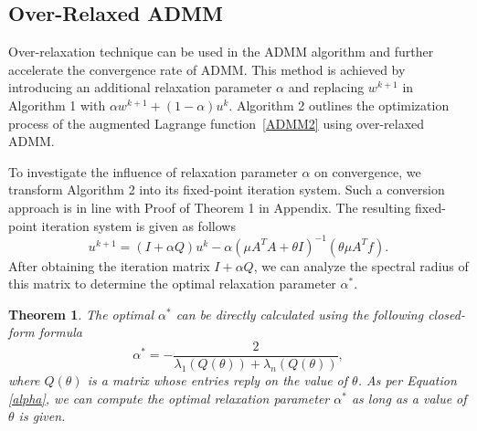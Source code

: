 \documentclass[letterpaper]{article} %
\newtheorem{theorem}{Theorem}
\begin{document}
\subsection{Over-Relaxed ADMM}
Over-relaxation technique can be used in the ADMM algorithm and further accelerate the convergence rate of ADMM. This method is achieved by introducing an additional relaxation parameter $\alpha$ and replacing $w^{k+1}$ in Algorithm 1 with $\alpha w^{k+1}+\left(1-\alpha\right)u^k$. Algorithm 2 outlines  the optimization process of the augmented Lagrange function~\eqref{ADMM2} using over-relaxed ADMM.
\begin{table}[t]
	\label{OR}
	\centering
\end{table}

To investigate the influence of relaxation parameter $\alpha$ on convergence, we transform Algorithm 2 into its fixed-point iteration system. Such a conversion approach is in line with Proof of Theorem 1 in Appendix. The resulting fixed-point iteration system is given as follows
\begin{equation*}
	u^{k+1} = \left(I+ \alpha Q\right) u^{k}- \alpha\left(\mu A^T A+\theta I\right)^{-1}\left(\theta\mu A^T f\right).
\end{equation*}
After obtaining the iteration matrix $I+ \alpha Q$, we can analyze the spectral radius of this matrix to determine the optimal relaxation parameter $\alpha^*$.

\begin{theorem}
The optimal $\alpha^*$ can be directly calculated using the following closed-form formula
\begin{equation}\label{alpha}
	\alpha^* = -\frac{2}{\lambda_1\left(Q\left(\theta\right)\right)+\lambda_n\left(Q\left(\theta\right)\right)},
\end{equation}
where $Q(\theta)$ is a matrix whose entries reply on the value of $\theta$. As per Equation \eqref{alpha}, we can compute the optimal relaxation parameter $\alpha^*$ as long as a value of $\theta$ is given. 
\end{theorem}
\end{document}
